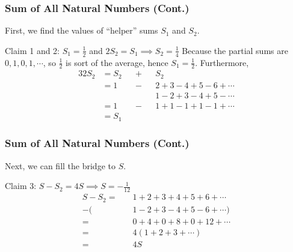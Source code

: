 \documentclass{beamer}
\begin{document}

\begin{frame}
\frametitle{Sum of All Natural Numbers (Cont.)}

First, we find the values of ``helper'' sums $S_1$ and $S_2$. 

\begin{block}{Claim 1 and 2: $ S_1 = \frac{1}{2} $ and $ 2 S_2 = S_1 \implies S_2 = \frac{1}{4} $}
Because the partial sums are $0, 1, 0, 1, \cdots$, so $\frac{1}{2}$ is sort of the average, hence $ S_1 = \frac{1}{2} $. Furthermore, 
\begin{alignat*}{3}
2 S_2 &= S_2 && + && S_2 \\
      &= 1   && - && 2 + 3 - 4 + 5 - 6 + \cdots \\ 
      &      &&   && 1 - 2 + 3 - 4 + 5 - \cdots \\ 
      &= 1   && - && 1 + 1 - 1 + 1 - 1 + \cdots \\
      &= S_1 &&   &&
\end{alignat*}
\end{block}

\end{frame}


\begin{frame}
\frametitle{Sum of All Natural Numbers (Cont.)}

Next, we can fill the bridge to $S$. 

\begin{block}{Claim 3: $ S - S_2 = 4 S \implies S = -\frac{1}{12} $}
\begin{align*}
    S - S_2 = \quad &1 + 2 + 3 + 4 + 5 + 6 + \cdots \\ 
            -( &1 - 2 + 3 - 4 + 5 - 6 + \cdots) \\ 
            = \quad &0 + 4 + 0 + 8 + 0 + 12 + \cdots \\ 
            = \quad &4(1 + 2 + 3 + \cdots) \\ 
            = \quad &4S
\end{align*}
\end{block}

\end{frame}

\end{document}
